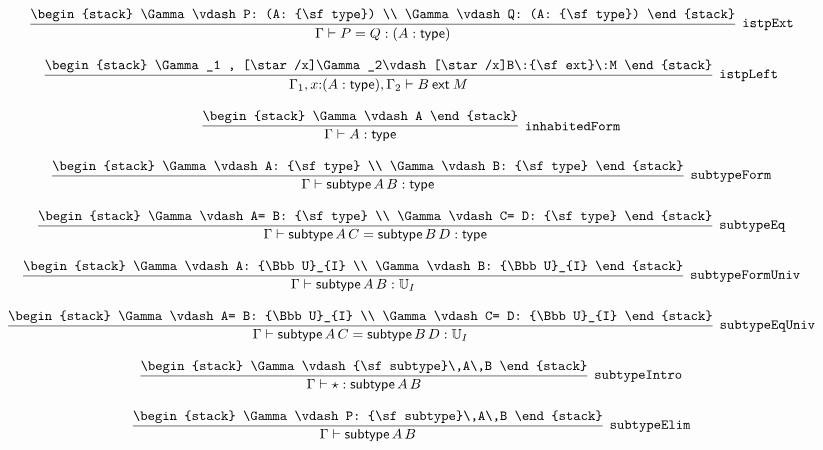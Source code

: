 \[
\infer[{\tt istpExt}]{\Gamma \vdash P= Q: (A: {\sf type})}{
\begin{stack}
\Gamma \vdash P: (A: {\sf type})
\\
\Gamma \vdash Q: (A: {\sf type})
\end{stack}}
\]

\[
\infer[{\tt istpLeft}]{\Gamma_1 ,x\mathord{:}(A: {\sf type}), \Gamma_2 \vdash B\:{\sf ext}\:M}{
\begin{stack}
\Gamma_1 , [\star /x]\Gamma_2\vdash [\star /x]B\:{\sf ext}\:M
\end{stack}}
\]

\[
\infer[{\tt inhabitedForm}]{\Gamma \vdash A: {\sf type}}{
\begin{stack}
\Gamma \vdash A
\end{stack}}
\]

\[
\infer[{\tt subtypeForm}]{\Gamma \vdash {\sf subtype}\,A\,B: {\sf type}}{
\begin{stack}
\Gamma \vdash A: {\sf type}
\\
\Gamma \vdash B: {\sf type}
\end{stack}}
\]

\[
\infer[{\tt subtypeEq}]{\Gamma \vdash {\sf subtype}\,A\,C= {\sf subtype}\,B\,D: {\sf type}}{
\begin{stack}
\Gamma \vdash A= B: {\sf type}
\\
\Gamma \vdash C= D: {\sf type}
\end{stack}}
\]

\[
\infer[{\tt subtypeFormUniv}]{\Gamma \vdash {\sf subtype}\,A\,B: {\Bbb U}_{I}}{
\begin{stack}
\Gamma \vdash A: {\Bbb U}_{I}
\\
\Gamma \vdash B: {\Bbb U}_{I}
\end{stack}}
\]

\[
\infer[{\tt subtypeEqUniv}]{\Gamma \vdash {\sf subtype}\,A\,C= {\sf subtype}\,B\,D: {\Bbb U}_{I}}{
\begin{stack}
\Gamma \vdash A= B: {\Bbb U}_{I}
\\
\Gamma \vdash C= D: {\Bbb U}_{I}
\end{stack}}
\]

\[
\infer[{\tt subtypeIntro}]{\Gamma \vdash \star : {\sf subtype}\,A\,B}{
\begin{stack}
\Gamma \vdash {\sf subtype}\,A\,B
\end{stack}}
\]

\[
\infer[{\tt subtypeElim}]{\Gamma \vdash {\sf subtype}\,A\,B}{
\begin{stack}
\Gamma \vdash P: {\sf subtype}\,A\,B
\end{stack}}
\]

